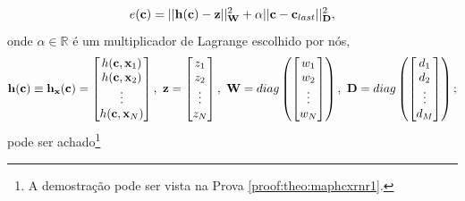 \begin{theorem}
\begin{equation}\label{eq:maphcxrnr1:2}
e(\VECTOR{c}) =  ||\VECTOR{h}(\VECTOR{c})-\VECTOR{z}||_{\MATRIX{W}}^2 + \alpha||\VECTOR{c}-\VECTOR{c}_{last}||_{\MATRIX{D}}^2,
\end{equation}
onde $\alpha \in \mathbb{R}$ é um multiplicador de Lagrange escolhido por nós,
\begin{equation}
\VECTOR{h}(\VECTOR{c})\equiv \VECTOR{h}_{\VECTOR{x}}(\VECTOR{c})=\begin{bmatrix}
h(\VECTOR{c},\VECTOR{x}_1)\\ 
h(\VECTOR{c},\VECTOR{x}_2)\\ 
\vdots\\ 
h(\VECTOR{c},\VECTOR{x}_N)
\end{bmatrix},
~
\VECTOR{z}=\begin{bmatrix}
z_1\\ 
z_2\\ 
\vdots\\ 
z_N
\end{bmatrix},
~
\MATRIX{W}=\funcdiag\left(\begin{bmatrix}
w_1\\ 
w_2\\ 
\vdots\\ 
w_N
\end{bmatrix}\right),
~
\MATRIX{D}=\funcdiag\left(\begin{bmatrix}
d_1\\ 
d_2\\ 
\vdots\\ 
d_M
\end{bmatrix}\right);
\end{equation}
pode ser achado\footnote{A demostração pode ser vista na Prova \ref{proof:theo:maphcxrnr1}.} 

\end{theorem}
